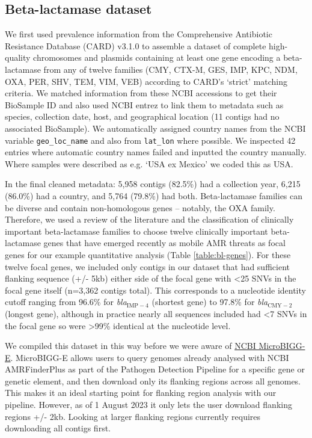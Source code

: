 \documentclass[rmp,superscriptaddress,11pt]{revtex4-1}
\newcommand{\bla}[1]{\textit{bla}$_\mathrm{#1}$}
\begin{document}
\subsection*{Beta-lactamase dataset}

\noindent  We first used prevalence information from the Comprehensive Antibiotic Resistance Database (CARD) v3.1.0 \cite{Alcock2023} to assemble a dataset of complete high-quality chromosomes and plasmids containing at least one gene encoding a beta-lactamase from any of twelve families (CMY, CTX-M, GES, IMP, KPC, NDM, OXA, PER, SHV, TEM, VIM, VEB) according to CARD's `strict' matching criteria. We matched information from these NCBI accessions to get their BioSample ID and also used NCBI entrez to link them to metadata such as species, collection date, host, and geographical location (11 contigs had no associated BioSample). We automatically assigned country names from the NCBI variable \texttt{geo\_loc\_name} and also from \texttt{lat\_lon} where possible. We inspected 42 entries where automatic country names failed and inputted the country manually. Where samples were described as e.g. `USA ex Mexico' we coded this as USA. 

\par 
In the final cleaned metadata: 5,958 contigs (82.5\%) had a collection year, 6,215 (86.0\%) had a country, and 5,764 (79.8\%) had both. Beta-lactamase families can be diverse and contain non-homologous genes {--} notably, the OXA family. Therefore, we used a review of the literature and the classification of clinically important beta-lactamase families \cite{Bush2010} to choose twelve clinically important beta-lactamase genes that have emerged recently as mobile AMR threats as focal genes for our example quantitative analysis (Table \ref{table:bl-genes}). For these twelve focal genes, we included only contigs in our dataset that had sufficient flanking sequence (+/- 5kb) either side of the focal gene with <25 SNVs in the focal gene itself (n=3,362 contigs total). This corresponds to a nucleotide identity cutoff ranging from 96.6\% for \bla{IMP-4} (shortest gene) to 97.8\% for \bla{CMY-2} (longest gene), although in practice nearly all sequences included had <7 SNVs in the focal gene so were >99\% identical at the nucleotide level.
\par

We compiled this dataset in this way before we were aware of \href{https://www.ncbi.nlm.nih.gov/pathogens/microbigge/}{NCBI MicroBIGG-E}. MicroBIGG-E allows users to query genomes already analysed with NCBI AMRFinderPlus as part of the Pathogen Detection Pipeline for a specific gene or genetic element, and then download only its flanking regions across all genomes. This makes it an ideal starting point for flanking region analysis with our pipeline. However, as of 1 August 2023 it only lets the user download flanking regions +/- 2kb. Looking at larger flanking regions currently requires downloading all contigs first.
\end{document}
